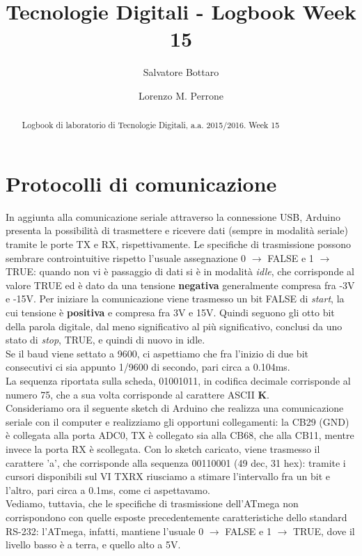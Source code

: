 \documentclass[journal, a4paper]{IEEEtran}
\begin{document}
	\title{Tecnologie Digitali - Logbook Week 15}
	\author[1]{Salvatore Bottaro}
		\author[2]{Lorenzo M. Perrone}
	\maketitle
	
\begin{abstract}
	Logbook di laboratorio di Tecnologie Digitali, a.a. 2015/2016. Week 15
\end{abstract}

\section{Protocolli di comunicazione}
In aggiunta alla comunicazione seriale attraverso la connessione USB, Arduino presenta la possibilità di trasmettere e ricevere dati (sempre in modalità seriale) tramite le porte TX e RX, rispettivamente. Le specifiche di trasmissione possono sembrare controintuitive rispetto l'usuale assegnazione 0 $\rightarrow$ FALSE e 1 $\rightarrow$ TRUE: quando non vi è passaggio di dati si è in modalità \textit{idle}, che corrisponde al valore TRUE ed è dato da una tensione \textbf{negativa} generalmente compresa fra -3V e -15V. Per iniziare la comunicazione viene trasmesso un bit FALSE di \textit{start}, la cui tensione è \textbf{positiva} e compresa fra 3V e 15V. Quindi seguono gli otto bit della parola digitale, dal meno significativo al più significativo, conclusi da uno stato di \textit{stop}, TRUE, e quindi di nuovo in idle.\\
Se il baud viene settato a 9600, ci aspettiamo che fra l'inizio di due bit consecutivi ci sia appunto 1/9600 di secondo, pari circa a 0.104ms.\\
La sequenza riportata sulla scheda, 01001011, in codifica decimale corrisponde al numero 75, che a sua volta corrisponde al carattere ASCII \textbf{K}.\\

Consideriamo ora il seguente sketch di Arduino che realizza una comunicazione seriale con il computer e realizziamo gli opportuni collegamenti: la CB29 (GND) è collegata alla porta ADC0, TX è collegato sia alla CB68, che alla CB11, mentre invece la porta RX è scollegata. Con lo sketch caricato, viene trasmesso il carattere 'a', che corrisponde alla sequenza 00110001 (49 dec, 31 hex): tramite i cursori disponibili sul VI \textsc{TXRX} riusciamo a stimare l'intervallo fra un bit e l'altro, pari circa a 0.1ms, come ci aspettavamo.\\
Vediamo, tuttavia, che le specifiche di trasmissione dell'ATmega non corrispondono con quelle esposte precedentemente caratteristiche dello standard RS-232: l'ATmega, infatti, mantiene l'usuale 0 $\rightarrow$ FALSE e 1 $\rightarrow$ TRUE, dove il livello basso è a terra, e quello alto a 5V.\\
\end{document}
